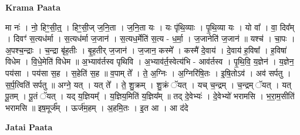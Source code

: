 \documentclass[17pt]{extarticle}
\begin{document}
\textbf{Krama Paata} \newline

मा नः॑ । नो॒ हिꣳ॒॒सी॒त्॒ । हिꣳ॒॒सी॒ज् ज॒नि॒ता । ज॒नि॒ता यः । यः पृ॑थि॒व्याः । पृ॒थि॒व्या यः । यो वा᳚ । वा॒ दिव᳚म् । दिवꣳ॑ स॒त्यध॑र्मा । स॒त्यध॑र्मा ज॒जान॑ । स॒त्यध॒र्मेति॑ स॒त्य - ध॒र्मा॒ । ज॒जानेति॑ ज॒जान॑ ॥ यश्च॑ । चा॒पः । अ॒पश्च॒न्द्राः । च॒न्द्रा बृ॑ह॒तीः । बृ॒ह॒तीर् ज॒जान॑ । ज॒जान॒ कस्मे᳚ । कस्मै॑ दे॒वाय॑ । दे॒वाय॑ ह॒विषा᳚ । ह॒विषा॑ विधेम । वि॒धे॒मेति॑ विधेम ॥ अ॒भ्याव॑र्तस्व पृथिवि । अ॒भ्याव॑र्त॒स्वेत्य॑भि - आव॑र्तस्व । पृ॒थि॒वि॒ य॒ज्ञेन॑ । य॒ज्ञेन॒ पय॑सा । पय॑सा स॒ह । स॒हेति॑ स॒ह ॥ व॒पाम् ते᳚ । ते॒ अ॒ग्निः । अ॒ग्निरि॑षि॒तः । इ॒षि॒तोऽव॑ । अव॑ सर्पतु । स॒र्प॒त्विति॑ सर्पतु ॥ अग्ने॒ यत् । यत् ते᳚ । ते॒ शु॒क्रम् । शु॒क्रं ॅयत् । यच् च॒न्द्रम् । च॒न्द्रम् ॅयत् । यत् पू॒तम् । पू॒तं ॅयत् । यद् य॒ज्ञियम्᳚ । य॒ज्ञिय॒मिति॑ य॒ज्ञिय᳚म् ॥ तद् दे॒वेभ्यः॑ । दे॒वेभ्यो॑ भरामसि । भ॒रा॒म॒सीति॑ भरामसि ॥ इष॒मूर्ज᳚म् । ऊर्ज॑म॒हम् । अ॒हमि॒तः । इ॒त आ । आ द॑दे \newline

\textbf{Jatai Paata} \newline
\end{document}
